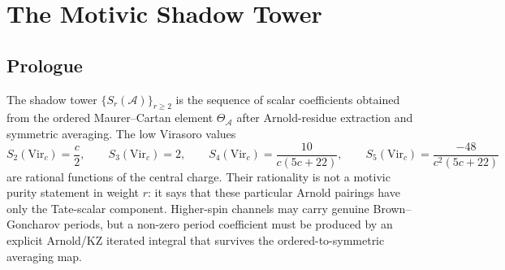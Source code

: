 
\providecommand{\MZV}{\mathrm{MZV}}
\providecommand{\mot}{\mathrm{mot}}
\providecommand{\num}{\mathrm{num}}
\providecommand{\GRT}{\mathrm{GRT}_1}
\providecommand{\grt}{\mathfrak{grt}_1}
\providecommand{\Face}{\mathrm{Face}}
\providecommand{\cA}{\mathcal{A}}
\providecommand{\cF}{\mathcal{F}}
\providecommand{\PhiFA}{\Phi^{\mathrm{FA}}}
\providecommand{\SpCh}{\mathrm{Sp}^{\mathrm{ch}}}
\providecommand{\cW}{\mathcal{W}}
\providecommand{\Walg}{\mathcal{W}}
\providecommand{\Vir}{\mathrm{Vir}}
\providecommand{\MC}{\mathrm{MC}}
\providecommand{\wt}{\mathrm{wt}}
\providecommand{\rat}{\mathrm{rat}}
\providecommand{\KZ}{\mathrm{KZ}}
\providecommand{\Delta}{\Delta}
\providecommand{\zet}{\zeta}
\providecommand{\Li}{\mathrm{Li}}
\providecommand{\per}{\mathrm{per}}
\providecommand{\coll}{\mathrm{coll}}
\providecommand{\Res}{\operatorname{Res}}
\providecommand{\fg}{\mathfrak{g}}
\providecommand{\Fil}{\mathrm{Fil}}
\providecommand{\ClaimStatusConditional}{}

\chapter{The Motivic Shadow Tower}
\label{ch:motivic-shadow-tower}

\section*{Prologue}

The shadow tower $\{S_r(\cA)\}_{r \geq 2}$ is the sequence of scalar
coefficients obtained from the ordered Maurer--Cartan element
$\Theta_{\cA}$ after Arnold-residue extraction and symmetric averaging.
The low Virasoro values
\[
 S_2(\Vir_c)=\frac c2,\qquad S_3(\Vir_c)=2,\qquad
 S_4(\Vir_c)=\frac{10}{c(5c+22)},\qquad
 S_5(\Vir_c)=\frac{-48}{c^2(5c+22)}
\]
are rational functions of the central charge. Their rationality is not
a motivic purity statement in weight $r$: it says that these particular
Arnold pairings have only the Tate-scalar component. Higher-spin
channels may carry genuine Brown--Goncharov periods, but a non-zero
period coefficient must be produced by an explicit Arnold/KZ iterated
integral that survives the ordered-to-symmetric averaging map.

